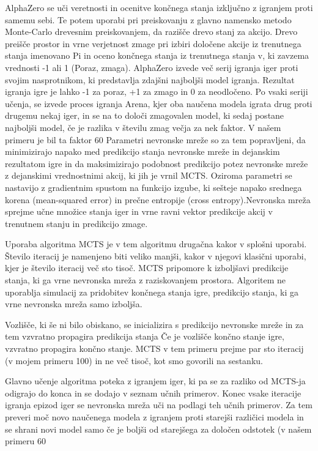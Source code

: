 \documentclass[a4paper, 12pt]{book}
\begin{document}
AlphaZero se uči veretnosti in ocenitve končnega stanja izključno z igranjem proti samemu sebi. 
Te potem uporabi pri preiskovanju z glavno namensko metodo Monte-Carlo drevesnim preiskovanjem, da razišče drevo stanj za akcijo.
Drevo preišče prostor in vrne verjetnost zmage pri izbiri določene akcije iz trenutnega stanja imenovano Pi in oceno končnega stanja iz trenutnega stanja v, ki zavzema vrednosti -1 ali 1 (Poraz, zmaga).
AlphaZero izvede več serij igranja iger proti svojim nasprotnikom, ki predstavlja zdajšni najboljši model igranja.
Rezultat igranja igre je lahko -1 za poraz, +1 za zmago in 0 za neodločeno.
Po vsaki seriji učenja, se izvede proces igranja Arena, kjer oba naučena modela igrata drug proti drugemu nekaj iger, in se na to določi zmagovalen model, ki sedaj postane najboljši model, če je razlika v številu zmag večja za nek faktor. V našem primeru je bil ta faktor 60%
Parametri nevronske mreže so za tem popravljeni, da minimizirajo napako med predikcijo stanja nevronske mreže in dejanskim rezultatom igre in da maksimizirajo podobnost predikcijo potez nevronske mreže z dejanskimi vrednostnimi akcij, ki jih je vrnil MCTS. Oziroma parametri se nastavijo z gradientnim spustom na funkcijo izgube, ki sešteje napako srednega korena (mean-squared error) in prečne entropije (cross entropy).Nevronska mreža sprejme učne množice stanja iger in vrne ravni vektor predikcije akcij v trenutnem stanju in predikcijo zmage.

Uporaba algoritma MCTS je v tem algoritmu drugačna kakor v splošni uporabi.
Število iteracij je namenjeno biti veliko manjši, kakor v njegovi klasični uporabi, kjer je število iteracij več sto tisoč. 
MCTS pripomore k izboljšavi predikcije stanja, ki ga vrne nevronska mreža z raziskovanjem prostora.
Algoritem ne uporablja simulacij za pridobitev končnega stanja igre, predikcijo stanja, ki ga vrne nevronska mreža samo izboljša.

Vozlišče, ki še ni bilo obiskano, se inicializira s predikcijo nevronske mreže in za tem vzvratno propagira predikcija stanja
Če je vozlišče končno stanje igre, vzvratno propagira končno stanje.
MCTS v tem primeru prejme par sto iteracij (v mojem primeru 100) in ne več tisoč, kot smo govorili na sestanku.

Glavno učenje algoritma poteka z igranjem iger, ki pa se za razliko od MCTS-ja odigrajo do konca in se dodajo v seznam učnih primerov.
Konec vsake iteracije igranja epizod iger se nevronska mreža uči na podlagi teh učnih primerov.
Za tem preveri moč novo naučenega modela z igranjem proti starejši različici modela in se shrani novi model samo če je boljši od starejšega za določen odstotek (v našem primeru 60%
\end{document}
